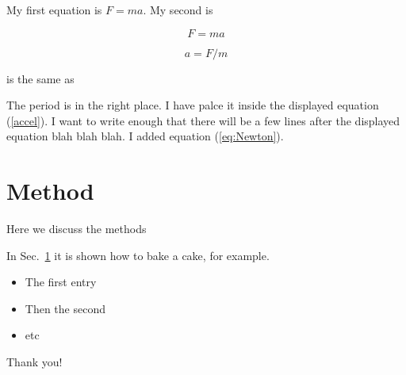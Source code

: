 \documentclass[11pt]{article}
\begin{document}
My first equation is $F=ma$. My second is

\begin{equation}
	\label{eq:Newton}
	F=ma
\end{equation}

\begin{equation}
	\label{accel}
	a=F/m
\end{equation}

is the same as

The period is in the right place. I have palce it inside the displayed equation
(\ref{accel}). I want to write enough that there will be a few lines
after the displayed equation blah blah blah. I added equation
(\ref{eq:Newton}).

\section{Method}
\label{my-methods}

Here we discuss the methods

In Sec.~\ref{my-methods} it is shown how to bake a cake, for example.

\begin{itemize}
	\item The first entry
	\item Then the second
	\item etc
\end{itemize}

Thank you!
\end{document}
